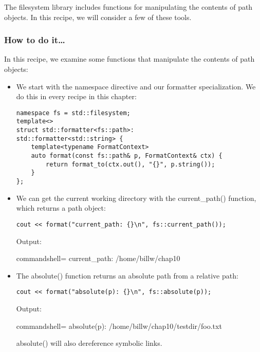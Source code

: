 
The filesystem library includes functions for manipulating the contents of path objects. In this recipe, we will consider a few of these tools.

\subsubsection{How to do it…}

In this recipe, we examine some functions that manipulate the contents of path objects:

\begin{itemize}
\item 
We start with the namespace directive and our formatter specialization. We do this in every recipe in this chapter:

\begin{lstlisting}[style=styleCXX]
namespace fs = std::filesystem;
template<>
struct std::formatter<fs::path>:
std::formatter<std::string> {
	template<typename FormatContext>
	auto format(const fs::path& p, FormatContext& ctx) {
		return format_to(ctx.out(), "{}", p.string());
	}
};
\end{lstlisting}

\item 
We can get the current working directory with the current\_path() function, which returns a path object:

\begin{lstlisting}[style=styleCXX]
cout << format("current_path: {}\n", fs::current_path());
\end{lstlisting}

Output:

\begin{tcblisting}{commandshell={}}
current_path: /home/billw/chap10
\end{tcblisting}

\item 
The absolute() function returns an absolute path from a relative path:

\begin{lstlisting}[style=styleCXX]
cout << format("absolute(p): {}\n", fs::absolute(p));
\end{lstlisting}

Output:

\begin{tcblisting}{commandshell={}}
absolute(p): /home/billw/chap10/testdir/foo.txt
\end{tcblisting}

absolute() will also dereference symbolic links.


\end{itemize}
